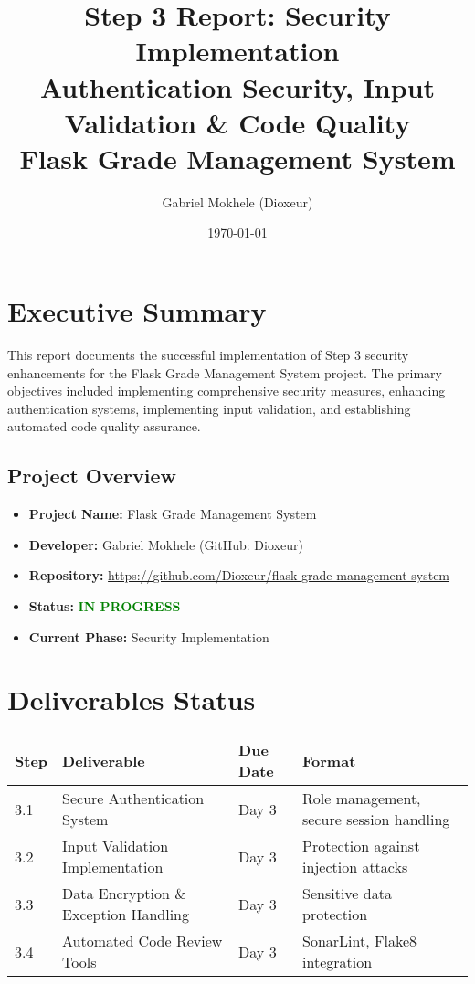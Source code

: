\documentclass[12pt,a4paper]{article}
\title{\textbf{Step 3 Report: Security Implementation} \\ 
       \large Authentication Security, Input Validation \& Code Quality \\
       \vspace{0.5cm}
       \large Flask Grade Management System}
\author{Gabriel Mokhele (Dioxeur)}
\date{\today}
\begin{document}
\maketitle
\thispagestyle{empty}

\newpage

\tableofcontents
\newpage

\section{Executive Summary}

This report documents the successful implementation of Step 3 security enhancements for the Flask Grade Management System project. The primary objectives included implementing comprehensive security measures, enhancing authentication systems, implementing input validation, and establishing automated code quality assurance.

\subsection{Project Overview}
\begin{itemize}
    \item \textbf{Project Name:} Flask Grade Management System
    \item \textbf{Developer:} Gabriel Mokhele (GitHub: Dioxeur)
    \item \textbf{Repository:} \url{https://github.com/Dioxeur/flask-grade-management-system}
    \item \textbf{Status:} \textcolor{green}{\textbf{IN PROGRESS}}
    \item \textbf{Current Phase:} Security Implementation
\end{itemize}

\section{Deliverables Status}

\begin{longtable}{|p{2cm}|p{4cm}|p{2cm}|p{6cm}|}
\hline
\textbf{Step} & \textbf{Deliverable} & \textbf{Due Date} & \textbf{Format} \\
\hline
\endhead
3.1 & Secure Authentication System & Day 3 & Role management, secure session handling \\
\hline
3.2 & Input Validation Implementation & Day 3 & Protection against injection attacks \\
\hline
3.3 & Data Encryption \& Exception Handling & Day 3 & Sensitive data protection \\
\hline
3.4 & Automated Code Review Tools & Day 3 & SonarLint, Flake8 integration \\
\hline
\end{longtable}
\end{document}
